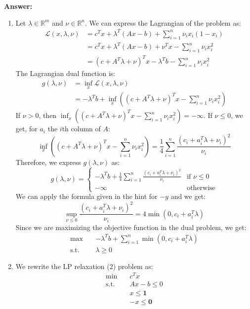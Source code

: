 \documentclass[11pt,a4paper]{article}
\newenvironment{solution}{
  \par\noindent\textbf{Answer:}\vspace{0.3em}
}{\vspace{1em}}
\begin{document}
\begin{solution}
    \begin{enumerate}
        \item Let $\lambda \in \mathbb{R}^m$ and $\nu \in \mathbb{R}^n$. We can express the Lagrangian of the problem as: $$\begin{aligned}
            \mathcal{L}(x, \lambda, \nu)
            &= c^T x + \lambda^T (Ax - b) + \sum_{i=1}^n \nu_i x_i (1 - x_i)\\
            &= c^T x + \lambda^T (Ax - b) + \nu^T x - \sum_{i=1}^n \nu_i x_i^2\\
            &= (c + A^T \lambda + \nu)^T x - \lambda^T b - \sum_{i=1}^n \nu_i x_i^2
        \end{aligned}$$
        The Lagrangian dual function is: $$\begin{aligned}
            g(\lambda, \nu) 
            &= \inf_x \mathcal{L}(x, \lambda, \nu)\\
            &= -\lambda^T b + \inf_x \left( (c + A^T \lambda + \nu)^T x - \sum_{i=1}^n \nu_i x_i^2 \right)
        \end{aligned}$$
        If $\nu > 0$, then $\inf_x \left( (c + A^T \lambda + \nu)^T x - \sum_{i=1}^n \nu_i x_i^2 \right) = -\infty$. If $\nu \leq 0$, we get, for $a_i$ the $i$th column of $A$: $$\inf_x \left( (c + A^T \lambda + \nu)^T x - \sum_{i=1}^n \nu_i x_i^2 \right) = \frac{1}{4} \sum_{i=1}^n \frac{(c_i + a_i^T \lambda + \nu_i)^2}{\nu_i}$$
        Therefore, we express $g(\lambda, \nu)$ as: $$g(\lambda, \nu) = \begin{cases}
            -\lambda^T b + \frac{1}{4} \sum_{i=1}^n \frac{(c_i + a_i^T \lambda + \nu_i)^2}{\nu_i} &\text{if } \nu \leq 0\\
            -\infty &\text{otherwise}
        \end{cases}$$
        We can apply the formula given in the hint for $-y$ and we get: $$\sup_{\nu \leq 0} \frac{(c_i + a_i^T\lambda + \nu_i)^2}{\nu_i} = 4 \min (0, c_i + a_i^T \lambda)$$
        Since we are maximizing the objective function in the dual problem, we get: $$\begin{aligned}
            \max \quad & -\lambda^T b + \sum_{i=1}^n \min (0, c_i + a_i^T \lambda)\\
            \text{s.t.} \quad & \lambda \geq 0
        \end{aligned}$$



        \item We rewrite the LP relaxation (2) problem as: $$\begin{aligned}
            \min \quad & c^T x\\
            \text{s.t.} \quad & Ax - b \leq 0\\
            & x \leq \mathbf{1}\\
            & -x \leq \mathbf{0}
        \end{aligned}$$
        

\end{enumerate}
\end{solution}
\end{document}
